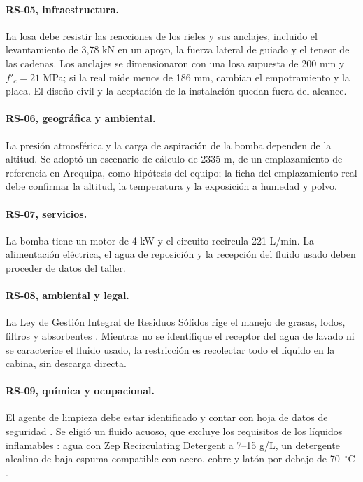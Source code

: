 \paragraph{RS-05, infraestructura.} La losa debe resistir las reacciones de los rieles y sus anclajes, incluido el levantamiento de 3,78 kN en un apoyo, la fuerza lateral de guiado y el tensor de las cadenas. Los anclajes se dimensionaron con una losa supuesta de 200 mm y $f'_c=21$ MPa; si la real mide menos de 186 mm, cambian el empotramiento y la placa. El diseño civil y la aceptación de la instalación quedan fuera del alcance.

\paragraph{RS-06, geográfica y ambiental.} La presión atmosférica y la carga de aspiración de la bomba dependen de la altitud. Se adoptó un escenario de cálculo de 2335 m, de un emplazamiento de referencia en Arequipa, como hipótesis del equipo; la ficha del emplazamiento real debe confirmar la altitud, la temperatura y la exposición a humedad y polvo.

\paragraph{RS-07, servicios.} La bomba tiene un motor de 4 kW y el circuito recircula 221 L/min. La alimentación eléctrica, el agua de reposición y la recepción del fluido usado deben proceder de datos del taller.

\paragraph{RS-08, ambiental y legal.} La Ley de Gestión Integral de Residuos Sólidos rige el manejo de grasas, lodos, filtros y absorbentes \cite{dleg1278}. Mientras no se identifique el receptor del agua de lavado ni se caracterice el fluido usado, la restricción es recolectar todo el líquido en la cabina, sin descarga directa.

\paragraph{RS-09, química y ocupacional.} El agente de limpieza debe estar identificado y contar con hoja de datos de seguridad \cite{ds024}. Se eligió un fluido acuoso, que excluye los requisitos de los líquidos inflamables \cite{en12921_2}: agua con Zep Recirculating Detergent a 7--15 g/L, un detergente alcalino de baja espuma compatible con acero, cobre y latón por debajo de 70~$^\circ$C \cite{zep36342}.

